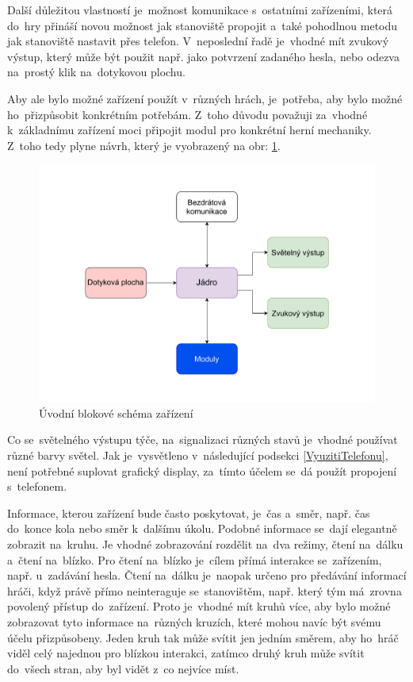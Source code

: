 Další důležitou vlastností je~možnost komunikace s~ostatními zařízeními, která do~hry přináší novou možnost jak stanoviště propojit a~také pohodlnou metodu jak stanoviště nastavit přes telefon.
V~neposlední řadě je~vhodné mít zvukový výstup, který může být použit např. jako potvrzení zadaného hesla, nebo odezva na~prostý klik na~dotykovou plochu.

Aby ale bylo možné zařízení použít v~různých hrách, je~potřeba, aby bylo možné ho~přizpůsobit konkrétním potřebám.
Z~toho důvodu považuji za~vhodné k~základnímu zařízení moci připojit modul pro konkrétní herní mechaniky.
Z~toho tedy plyne návrh, který je vyobrazený na obr: \ref{fig:diagram_zanoreni_0}.
\begin{figure}[h]
    \centering
    \includegraphics[width=\textwidth]{text/TeoretickyUvod/AplikaceHernichZarizeni/diagram/zanoreni_0.pdf}
    \caption{Úvodní blokové schéma zařízení}
    \label{fig:diagram_zanoreni_0}
\end{figure}

Co se~světelného výstupu týče, na~signalizaci různých stavů je~vhodné používat různé barvy světel.
Jak je~vysvětleno v~následující podsekci \ref{VyuzitiTelefonu}, není potřebné suplovat grafický display, za~tímto účelem se~dá použít propojení s~telefonem.

Informace, kterou zařízení bude často poskytovat, je~čas a~směr, např. čas do~konce kola nebo směr k~dalšímu úkolu.
Podobné informace se~dají elegantně zobrazit na~kruhu.
Je vhodné zobrazování rozdělit na~dva režimy, čtení na~dálku a~čtení na~blízko.
Pro čtení na~blízko je~cílem přímá interakce se~zařízením, např. u~zadávání hesla.
Čtení na~dálku je~naopak určeno pro předávání informací hráči, když právě přímo neinteraguje se~stanovištěm, např. který tým má~zrovna povolený přístup do~zařízení.
Proto je~vhodné mít kruhů více, aby bylo možné zobrazovat tyto informace na~různých kruzích, které mohou navíc být svému účelu přizpůsobeny.
Jeden kruh tak může svítit jen jedním směrem, aby ho~hráč viděl celý najednou pro blízkou interakci, zatímco druhý kruh může svítit do~všech stran, aby byl vidět z~co nejvíce míst.

